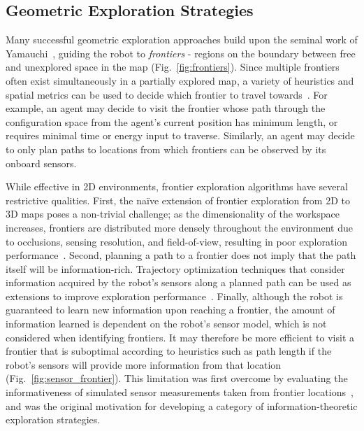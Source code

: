 \subsection{Geometric Exploration Strategies}

Many successful geometric exploration approaches build upon the seminal work of
Yamauchi~\cite{yamauchi1997frontier}, guiding the robot to \textit{frontiers} - regions on the boundary
between free and unexplored space in the map (Fig.~\ref{fig:frontiers}).
Since multiple frontiers often exist simultaneously in a partially explored map, a
variety of heuristics and spatial metrics can be used to decide which frontier to
travel towards~\cite{lavalle2006planning}. For example, an agent may decide to
visit the frontier whose path through the configuration space from the agent's current
position has minimum length, or requires minimal time or energy input to
traverse. Similarly, an agent may decide to only plan paths to locations
from which frontiers can be observed by its onboard sensors.

While effective in 2D environments, frontier exploration algorithms have
several restrictive qualities. First, the na\"{i}ve extension of frontier exploration
from 2D to 3D maps poses a non-trivial challenge; as the
dimensionality of the workspace increases, frontiers are distributed more
densely throughout the environment due to occlusions, sensing resolution, and
field-of-view, resulting in poor exploration performance~\cite{shen20113d}.
Second, planning a path to a frontier does not imply that the path
itself will be information-rich. Trajectory optimization techniques that
consider information acquired by the robot's sensors along a planned path can be used
as extensions to improve exploration performance~\cite{sim2004online,kollar2008trajectory}.
Finally, although the robot is guaranteed to learn new information upon reaching a
frontier, the amount of information learned is dependent on the
robot's sensor model, which is not considered when identifying frontiers.
It may therefore be more efficient to visit a frontier that is
suboptimal according to heuristics such as path length if the robot's sensors
will provide more information from that location
(Fig.~\ref{fig:sensor_frontier}).
This limitation was first overcome by evaluating the informativeness of simulated
sensor measurements taken from frontier locations~\cite{gonzalez2002navigation}, and was the
original motivation for developing a category of information-theoretic exploration strategies.

